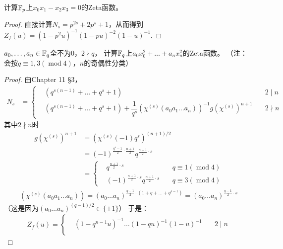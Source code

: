 \begin{exercise}\label{7.13}
    计算$\mathbb{F}_p$上$x_0x_1-x_2x_3=0$的Zeta函数。
\end{exercise}
\begin{proof}
    直接计算$N_s=p^{2s}+2p^s+1$，从而得到$Z_f(u)=(1-p^2u)^{-1}(1-pu)^{-2}(1-u)^{-1}$.
\end{proof}

\begin{exercise}\label{7.14}
    $a_0,\ldots,a_n\in\mathbb{F}_q$全不为$0$，$2\nmid q$，
    计算$\mathbb{F}_q$上$a_0x_0^2+\ldots+a_nx_n^2$的Zeta函数。
    （注：会按$q\equiv1,3(\operatorname{mod}4)$，$n$的奇偶性分类）
\end{exercise}
\begin{proof}
    由Chapter 11 \S 3，
    \begin{align*}
        N_s&=
        \left\{ 
        \begin{aligned}
        &(q^{s(n-1)}+\ldots+q^s+1)\quad&2\mid n\\
        &(q^{s(n-1)}+\ldots+q^s+1)+\dfrac{1}{q^s}(\chi^{(s)}(a_0a_1\ldots a_n))^{-1}
        g(\chi^{(s)})^{n+1}
        \quad&2\nmid n
        \end{aligned}
         \right.
    \end{align*}
    其中$2\nmid n$时
    \begin{align*}
        g(\chi^{(s)})^{n+1}
        &=(\chi^{(s)}(-1)q^s)^{(n+1)/2}\\
        &=(-1)^{\frac{q^s-1}{2}\cdot\frac{n+1}{2}}q^{\frac{n+1}{2}\cdot s}\\
        &=\left\{ 
        \begin{aligned}
            &q^{\frac{n+1}{2}\cdot s}\quad&q\equiv1(\operatorname{mod}4)\\
            &(-1)^{\frac{n+1}{2}\cdot s}q^{\frac{n+1}{2}\cdot s}\quad&q\equiv3(\operatorname{mod}4)
        \end{aligned}
         \right.
    \end{align*}
    \begin{align*}
        (\chi^{(s)}(a_0a_1\ldots a_n))
        =(a_0\ldots a_n)^{\frac{q-1}{2}\cdot(1+q+\ldots+q^{s-1})}
        =(a_0\ldots a_n)^{\frac{q-1}{2}\cdot s}
    \end{align*}
    （这是因为$(a_0\ldots a_n)^{(q-1)/2}\in\{\pm 1\}$）
    于是：
    \begin{align*}
        Z_f(u)=
        \left\{ 
        \begin{aligned}
            &(1-q^{n-1}u)^{-1}\ldots(1-qu)^{-1}(1-u)^{-1}\quad&2\mid n\\

\end{aligned}
\end{align*}
\end{proof}
